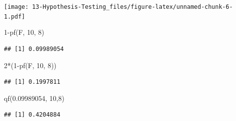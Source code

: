 \documentclass[
]{book}
\newenvironment{Shaded}{\begin{snugshade}}{\end{snugshade}}
\newcommand{\DecValTok}[1]{\textcolor[rgb]{0.00,0.00,0.81}{#1}}
\newcommand{\FloatTok}[1]{\textcolor[rgb]{0.00,0.00,0.81}{#1}}
\newcommand{\FunctionTok}[1]{\textcolor[rgb]{0.00,0.00,0.00}{#1}}
\newcommand{\NormalTok}[1]{#1}
\newcommand{\SpecialCharTok}[1]{\textcolor[rgb]{0.00,0.00,0.00}{#1}}
\begin{document}
\texttt{[image: 13-Hypothesis-Testing\_files/figure-latex/unnamed-chunk-6-1.pdf]}

\begin{Shaded}
\begin{Highlighting}[]
\DecValTok{1}\SpecialCharTok{{-}}\FunctionTok{pf}\NormalTok{(F, }\DecValTok{10}\NormalTok{, }\DecValTok{8}\NormalTok{)}
\end{Highlighting}
\end{Shaded}

\begin{verbatim}
## [1] 0.09989054
\end{verbatim}

\begin{Shaded}
\begin{Highlighting}[]
\DecValTok{2}\SpecialCharTok{*}\NormalTok{(}\DecValTok{1}\SpecialCharTok{{-}}\FunctionTok{pf}\NormalTok{(F, }\DecValTok{10}\NormalTok{, }\DecValTok{8}\NormalTok{))}
\end{Highlighting}
\end{Shaded}

\begin{verbatim}
## [1] 0.1997811
\end{verbatim}

\begin{Shaded}
\begin{Highlighting}[]
\FunctionTok{qf}\NormalTok{(}\FloatTok{0.09989054}\NormalTok{, }\DecValTok{10}\NormalTok{,}\DecValTok{8}\NormalTok{)}
\end{Highlighting}
\end{Shaded}

\begin{verbatim}
## [1] 0.4204884
\end{verbatim}
\end{document}

